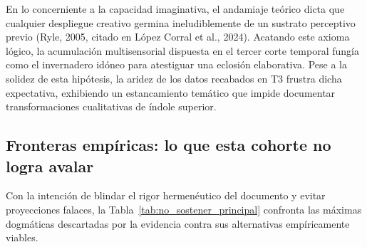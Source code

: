 \documentclass[12pt]{article}
\begin{document}
	En lo concerniente a la capacidad imaginativa, el andamiaje teórico dicta que cualquier despliegue creativo germina ineludiblemente de un sustrato perceptivo previo (Ryle, 2005, citado en López Corral et al., 2024). Acatando este axioma lógico, la acumulación multisensorial dispuesta en el tercer corte temporal fungía como el invernadero idóneo para atestiguar una eclosión elaborativa. Pese a la solidez de esta hipótesis, la aridez de los datos recabados en T3 frustra dicha expectativa, exhibiendo un estancamiento temático que impide documentar transformaciones cualitativas de índole superior.
	
	\subsection{Fronteras empíricas: lo que esta cohorte no logra avalar}
	
	Con la intención de blindar el rigor hermenéutico del documento y evitar proyecciones falaces, la Tabla~\ref{tab:no_sostener_principal} confronta las máximas dogmáticas descartadas por la evidencia contra sus alternativas empíricamente viables.
	
\end{document}
